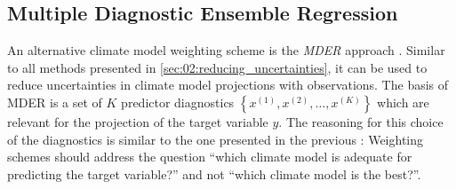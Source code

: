 \subsection{Multiple Diagnostic Ensemble Regression}
\label{subsec:02:mder}

An alternative climate model weighting scheme is the \emph{\ac{MDER}} approach
\autocite{Karpechko2013}. Similar to all methods presented in
\cref{sec:02:reducing_uncertainties}, it can be used to reduce uncertainties in
climate model projections with observations. The basis of \ac{MDER} is a set of
$K$ predictor diagnostics $\left\{ x^{(1)}, x^{(2)}, \ldots, x^{(K)} \right\}$
which are relevant for the projection of the target variable $y$. The reasoning
for this choice of the diagnostics is similar to the one presented in the
previous : Weighting schemes should address
the question \enquote{which climate model is adequate for predicting the target
  variable?} and not \enquote{which climate model is the best?}.

